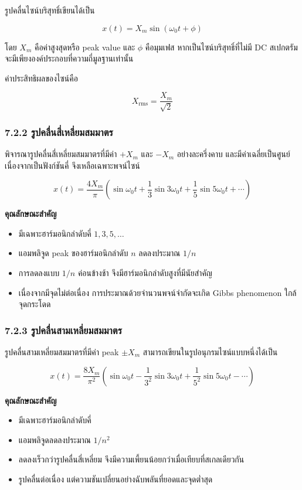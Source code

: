 รูปคลื่นไซน์บริสุทธิ์เขียนได้เป็น

\[
x(t)=X_m\sin(\omega_0 t+\phi)
\]

โดย $X_m$ คือค่าสูงสุดหรือ peak value และ $\phi$ คือมุมเฟส หากเป็นไซน์บริสุทธิ์ที่ไม่มี DC สเปกตรัมจะมีเพียงองค์ประกอบที่ความถี่มูลฐานเท่านั้น

ค่าประสิทธิผลของไซน์คือ

\[
X_{\mathrm{rms}}=\frac{X_m}{\sqrt{2}}
\]

\subsubsection{7.2.2 รูปคลื่นสี่เหลี่ยมสมมาตร}

พิจารณารูปคลื่นสี่เหลี่ยมสมมาตรที่มีค่า $+X_m$ และ $-X_m$ อย่างละครึ่งคาบ และมีค่าเฉลี่ยเป็นศูนย์ เนื่องจากเป็นฟังก์ชันคี่ จึงเหลือเฉพาะพจน์ไซน์

\[
x(t)=\frac{4X_m}{\pi}\left(\sin\omega_0 t+\frac{1}{3}\sin3\omega_0 t+\frac{1}{5}\sin5\omega_0 t+\cdots\right)
\]

\textbf{คุณลักษณะสำคัญ}

\begin{itemize}
    \item มีเฉพาะฮาร์มอนิกลำดับคี่ $1,3,5,\ldots$
    \item แอมพลิจูด peak ของฮาร์มอนิกลำดับ $n$ ลดลงประมาณ $1/n$
    \item การลดลงแบบ $1/n$ ค่อนข้างช้า จึงมีฮาร์มอนิกลำดับสูงที่มีนัยสำคัญ
    \item เนื่องจากมีจุดไม่ต่อเนื่อง การประมาณด้วยจำนวนพจน์จำกัดจะเกิด Gibbs phenomenon ใกล้จุดกระโดด
\end{itemize}

\subsubsection{7.2.3 รูปคลื่นสามเหลี่ยมสมมาตร}

รูปคลื่นสามเหลี่ยมสมมาตรที่มีค่า peak $\pm X_m$ สามารถเขียนในรูปอนุกรมไซน์แบบหนึ่งได้เป็น

\[
x(t)=\frac{8X_m}{\pi^2}\left(\sin\omega_0 t-\frac{1}{3^2}\sin3\omega_0 t+\frac{1}{5^2}\sin5\omega_0 t-\cdots\right)
\]

\textbf{คุณลักษณะสำคัญ}

\begin{itemize}
    \item มีเฉพาะฮาร์มอนิกลำดับคี่
    \item แอมพลิจูดลดลงประมาณ $1/n^2$
    \item ลดลงเร็วกว่ารูปคลื่นสี่เหลี่ยม จึงมีความเพี้ยนน้อยกว่าเมื่อเทียบที่สเกลเดียวกัน
    \item รูปคลื่นต่อเนื่อง แต่ความชันเปลี่ยนอย่างฉับพลันที่ยอดและจุดต่ำสุด
\end{itemize}

